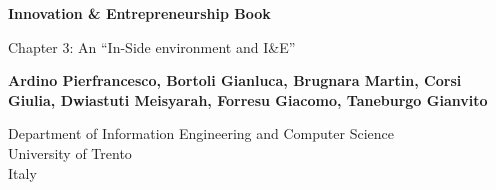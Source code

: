 
\begin{titlepage}
    \begin{center}
        \vspace*{1cm}

        \Huge
        \textbf{Innovation \& Entrepreneurship Book}

        \vspace{0.5cm}
        \LARGE
        Chapter 3: An ``In-Side environment and I\&E''

        \vspace{1.5cm}

        \textbf{
            Ardino Pierfrancesco,
            Bortoli Gianluca,
            Brugnara Martin,
            Corsi Giulia,
            Dwiastuti Meisyarah,
            Forresu Giacomo,
            Taneburgo Gianvito
        }

        \vfill

        \vspace{0.8cm}
        \Large
        Department of Information Engineering and Computer Science\\
        University of Trento\\
        Italy\\
    \end{center}
\end{titlepage}
